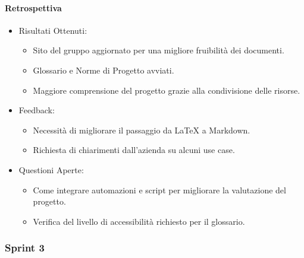 \documentclass{article}
\begin{document}
                \paragraph{Retrospettiva}
                \begin{itemize}
                    \item Risultati Ottenuti:
                        \begin{itemize}
                            \item Sito del gruppo aggiornato per una migliore fruibilità dei documenti.
                            \item Glossario e Norme di Progetto avviati.
                            \item Maggiore comprensione del progetto grazie alla condivisione delle risorse.
                        \end{itemize}
                    \item Feedback:
                        \begin{itemize}
                            \item Necessità di migliorare il passaggio da LaTeX a Markdown.
                            \item Richiesta di chiarimenti dall'azienda su alcuni use case.
                        \end{itemize}
                    \item Questioni Aperte:
                        \begin{itemize}
                            \item Come integrare automazioni e script per migliorare la valutazione del progetto.
                            \item Verifica del livello di accessibilità richiesto per il glossario.
                        \end{itemize}
                \end{itemize}
            \subsubsection{Sprint 3}
\end{document}

